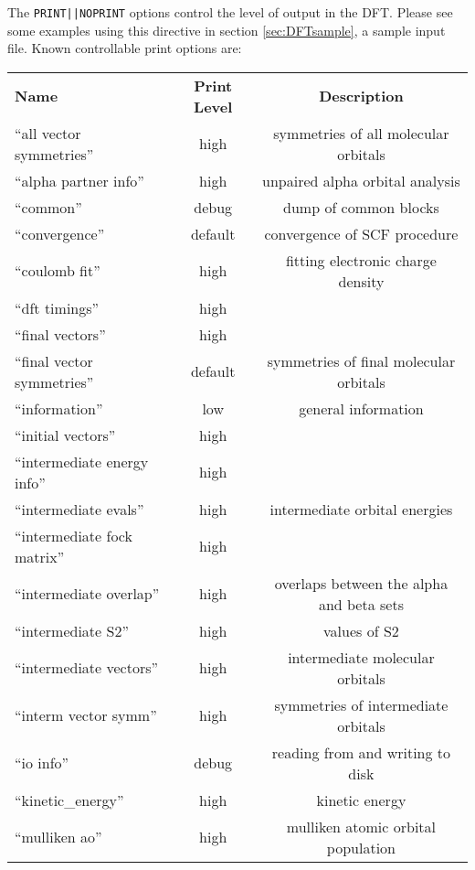 The \verb+PRINT||NOPRINT+ options control the level of output in the
DFT.  Please see some examples using this directive in
section  \ref{sec:DFTsample}, a sample input file.
  Known controllable print options are:

\begin{table}[htbp]
\begin{center}
\begin{tabular}{lcc}
  {\bf Name}          & {\bf Print Level} & {\bf Description} \\
 ``all vector symmetries''          & high        & symmetries of all molecular orbitals \\
 ``alpha partner info''             & high        & unpaired alpha orbital analysis \\
 ``common''                         & debug       & dump of common blocks \\
 ``convergence''                    & default     & convergence of SCF procedure \\
 ``coulomb fit''                    & high        & fitting electronic charge density \\
 ``dft timings''                    & high        & \\
 ``final vectors''                  & high        & \\
 ``final vector symmetries''        & default     & symmetries of final molecular orbitals \\
 ``information''                    & low         & general information  \\
 ``initial vectors''                & high        & \\
 ``intermediate energy info''       & high        & \\
 ``intermediate evals''             & high        & intermediate orbital energies \\
 ``intermediate fock matrix''       & high        & \\
 ``intermediate overlap''           & high        & overlaps between the alpha and beta sets \\
 ``intermediate S2''                & high        & values of S2 \\
 ``intermediate vectors''           & high        & intermediate molecular orbitals \\
 ``interm vector symm''             & high        & symmetries of intermediate orbitals \\
 ``io info''                        & debug       & reading from and writing to disk  \\
 ``kinetic\_energy''                & high        & kinetic energy \\
 ``mulliken ao''                    & high        & mulliken atomic orbital population \\


\end{tabular}
\end{center}
\end{table}
